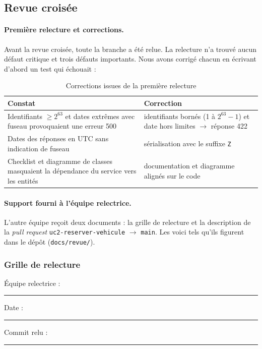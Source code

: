 \documentclass[11pt,a4paper]{article}
\begin{document}
\subsection{Revue croisée}

\paragraph{Première relecture et corrections.}
Avant la revue croisée, toute la branche a été relue. La relecture n'a trouvé aucun
défaut critique et trois défauts importants. Nous avons corrigé chacun en écrivant
d'abord un test qui échouait :

\begin{table}[H]
\centering
\begin{tabularx}{\textwidth}{L L}
\toprule
\textbf{Constat} & \textbf{Correction} \\
\midrule
Identifiants $\ge 2^{63}$ et dates extrêmes avec fuseau provoquaient une erreur 500 &
identifiants bornés (1 à $2^{63}-1$) et date hors limites $\rightarrow$ réponse 422 \\
Dates des réponses en UTC sans indication de fuseau &
sérialisation avec le suffixe \texttt{Z} \\
Checklist et diagramme de classes masquaient la dépendance du service vers les entités &
documentation et diagramme alignés sur le code \\
\bottomrule
\end{tabularx}
\caption{Corrections issues de la première relecture}
\end{table}

\paragraph{Support fourni à l'équipe relectrice.} L'autre équipe reçoit deux
documents : la grille de relecture et la description de la \emph{pull request}
\texttt{uc2-reserver-vehicule} $\rightarrow$ \texttt{main}. Les voici tels qu'ils
figurent dans le dépôt (\texttt{docs/revue/}).

\subsubsection*{Grille de relecture}

\noindent Équipe relectrice : \rule{4cm}{0.4pt}\hfill
Date : \rule{2.5cm}{0.4pt}\hfill
Commit relu : \rule{2.5cm}{0.4pt}
\end{document}
